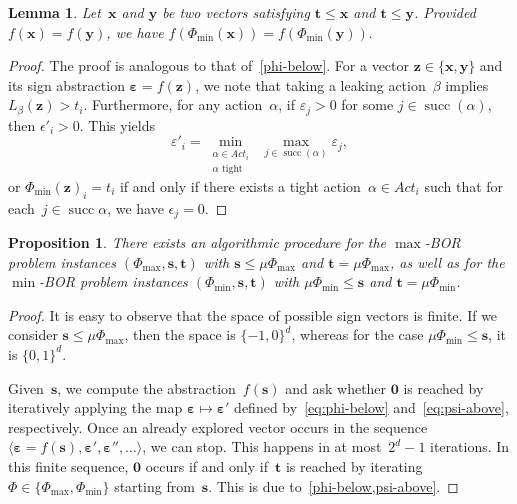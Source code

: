\documentclass[preprint,12pt]{elsarticle}
\theoremstyle{plain}
\newtheorem{lemma}[theorem]{Lemma}
\newtheorem{proposition}[theorem]{Proposition}
\theoremstyle{definition}
\theoremstyle{remark}
\theoremstyle{claimstyle}
\newcommand{\eps}{\bm{\varepsilon}}
\DeclareMathOperator*{\suc}{succ}
\begin{document}
\begin{lemma}\label{psi-above}
	Let~$\bm{x}$ and $\bm{y}$ be two vectors satisfying $\bm{t}\leq \bm{x}$ and $\bm{t}\leq \bm{y}$. 
	Provided $f(\bm{x}) = f(\bm{y})$, we have
	\(f(\Phi_{\min}(\bm{x})) = f(\Phi_{\min}(\bm{y})).\)
\end{lemma}
\begin{proof}
	The proof is analogous to that of~\cref{phi-below}.
	For a vector $\bm{z} \in \{\bm{x}, \bm{y}\}$ and its sign abstraction $\eps = f(\bm{z})$, 
	we note that taking a leaking action~$\beta$ implies $L_\beta(\bm{z}) > t_i$.
	Furthermore, for any action~$\alpha$,
	if  $\varepsilon_j > 0$ for some $j \in \suc(\alpha)$, then
	$\epsilon'_i > 0$.
	This yields	
	\begin{equation}\label{eq:psi-above}
		\varepsilon'_i = \min_{\substack{\alpha \in Act_i \\ \alpha \text{ tight}}} \; \max_{j \in \suc(\alpha)} \varepsilon_j,
	\end{equation}	
or $\Phi_{\min}(\bm{z})_i = t_i$ if and only if
there exists a tight action~$\alpha \in Act_i$ 
such that for each~$j \in \suc{\alpha}$, we have $\epsilon_j = 0$.
\end{proof}

\begin{proposition}\label{below-decid}
There exists an algorithmic procedure for the $\max$-BOR problem instances $(\Phi_{\max}, \bm{s}, \bm{t})$ with $\bm{s} \leq \mu\Phi_{\max}$ and $\bm{t} = \mu\Phi_{\max}$,
as well as for the $\min$-BOR problem instances
 $(\Phi_{\min}, \bm{s}, \bm{t})$ with $\mu\Phi_{\min}\leq \bm{s}$ and $\bm{t} = \mu\Phi_{\min}$.
\end{proposition}
\begin{proof}
It is easy to observe that the space of possible sign vectors is finite.
If we consider $\bm{s} \leq \mu\Phi_{\max}$, then the space is $\{-1,0\}^d$, whereas for the case $\mu\Phi_{\min} \leq \bm{s}$, it is $\{0,1\}^d$.

Given~$\bm{s}$, we compute the abstraction~$f(\bm{s})$ and ask whether $\bm{0}$ is reached by iteratively applying the map $\eps \mapsto \eps'$ defined by~\eqref{eq:phi-below} and~\eqref{eq:psi-above}, respectively.
Once an already explored vector occurs in the sequence $\langle\eps = f(\bm{s}), \eps', \eps'', \dots \rangle$, 
we can stop.
This happens in at most~$2^d -1$ iterations.
In this finite sequence, $\bm{0}$ occurs if and only if~$\bm{t}$ is reached by iterating~$\Phi \in \{\Phi_{\max}, \Phi_{\min}\}$ starting from~$\bm{s}$.
This is due to~\cref{phi-below,psi-above}.
\end{proof}
\end{document}

